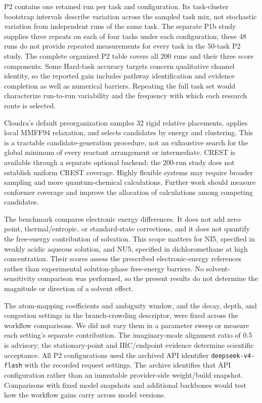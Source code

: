 
P2 contains one retained run per task and configuration. Its task-cluster bootstrap intervals describe variation across the sampled task mix, not stochastic variation from independent runs of the same task. The separate P1b study supplies three repeats on each of four tasks under each configuration; these 48 runs do not provide repeated measurements for every task in the 50-task P2 study. The complete organized P2 table covers all 200 runs and their three score components. Some Hard-task accuracy targets concern qualitative channel identity, so the reported gain includes pathway identification and evidence completion as well as numerical barriers. Repeating the full task set would characterize run-to-run variability and the frequency with which each research route is selected.

Cloudra's default preorganization samples 32 rigid relative placements, applies local MMFF94 relaxation, and selects candidates by energy and clustering. This is a tractable candidate-generation procedure, not an exhaustive search for the global minimum of every reactant arrangement or intermediate. CREST is available through a separate optional backend; the 200-run study does not establish uniform CREST coverage. Highly flexible systems may require broader sampling and more quantum-chemical calculations. Further work should measure conformer coverage and improve the allocation of calculations among competing candidates.

The benchmark compares electronic energy differences. It does not add zero-point, thermal/entropic, or standard-state corrections, and it does not quantify the free-energy contribution of solvation. This scope matters for NI5, specified in weakly acidic aqueous solution, and NU5, specified in dichloromethane at high concentration. Their scores assess the prescribed electronic-energy references rather than experimental solution-phase free-energy barriers. No solvent-sensitivity comparison was performed, so the present results do not determine the magnitude or direction of a solvent effect.

The atom-mapping coefficients and ambiguity window, and the decay, depth, and congestion settings in the branch-crowding descriptor, were fixed across the workflow comparisons. We did not vary them in a parameter sweep or measure each setting's separate contribution. The imaginary-mode alignment ratio of 0.5 is advisory; the stationary-point and IRC/endpoint evidence determine scientific acceptance. All P2 configurations used the archived API identifier \texttt{deepseek-v4-flash} with the recorded request settings. The archive identifies that API configuration rather than an immutable provider-side weight/build snapshot. Comparisons with fixed model snapshots and additional backbones would test how the workflow gains carry across model versions.
